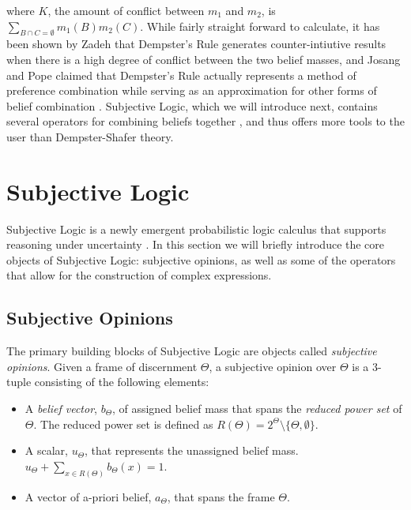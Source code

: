 \documentclass[thesis.tex]{subfiles}
\begin{document}
where $K$, the amount of conflict between $m_1$ and $m_2$, is $\sum_{B \cap C = \emptyset} m_1(B) m_2(C)$. While
fairly straight forward to calculate, it has been shown by Zadeh \cite{zadeh1979validity, zadeh1986simple}
that Dempster's Rule generates counter-intiutive results when there is a high degree of
conflict between the two belief masses, and Josang and Pope claimed that Dempster's Rule actually
represents a method of preference combination while serving as an approximation for other forms of belief
combination \cite{josang2012dempster}. Subjective Logic, which we will introduce next, contains several
operators for combining beliefs together \cite{josang2012interpretation, josang2010cumulative, josang2009fission, josang2009cumulative},
and thus offers more tools to the user than Dempster-Shafer theory.






















\section{Subjective Logic}

Subjective Logic is a newly emergent probabilistic logic calculus that supports reasoning
under uncertainty \cite{josang2001logic}. In this section we will briefly introduce the
core objects of Subjective Logic: subjective opinions, as well as some of the operators that
allow for the construction of complex expressions.







\subsection{Subjective Opinions}

The primary building blocks of Subjective Logic are
objects called \emph{subjective opinions}. Given a frame of discernment $\Theta$, a subjective
opinion over $\Theta$ is a 3-tuple consisting of the following elements:

\begin{itemize}
  \item A \emph{belief vector}, $b_\Theta$, of assigned belief mass that spans the \emph{reduced power set}
    of $\Theta$. The reduced power set is defined as $R \left(\Theta\right) = 2^\Theta \setminus \lbrace \Theta, \emptyset \rbrace$.
  \item A scalar, $u_\Theta$, that represents the unassigned belief mass.
    $u_\Theta + \sum_{x \in R\left(\Theta\right)} b_\Theta\left(x\right) = 1$.
  \item A vector of a-priori belief, $a_\Theta$, that spans the frame $\Theta$.
\end{itemize}
\end{document}
